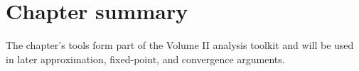 \section*{Chapter summary}
The chapter's tools form part of the Volume II analysis toolkit and will be used in later approximation, fixed-point, and convergence arguments.
